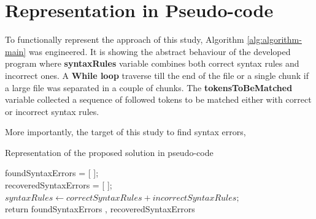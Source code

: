 \section{Representation in Pseudo-code}
To functionally represent the approach of this study, Algorithm \ref{alg:algorithm-main} was engineered. It is showing the abstract behaviour of the developed program where \textbf{syntaxRules} variable combines both correct syntax rules and incorrect ones. A \textbf{While loop} traverse till the end of the file or a single chunk if a large file was separated in a couple of chunks. The \textbf{tokensToBeMatched}  variable collected a sequence of followed tokens to be matched either with correct or incorrect syntax rules.

	\vspace{5mm} %
More importantly, the target of this study to find syntax errors,  
	\vspace{5mm} %

\begin{algorithm}[H] 
 \caption{Representation of the proposed solution  in pseudo-code}
 \label{alg:algorithm-main}

foundSyntaxErrors = [ ];\\
recoveredSyntaxErrors = [ ];\\
$syntaxRules \leftarrow correctSyntaxRules + incorrectSyntaxRules;$\\
return foundSyntaxErrors , recoveredSyntaxErrors
\end{algorithm}


